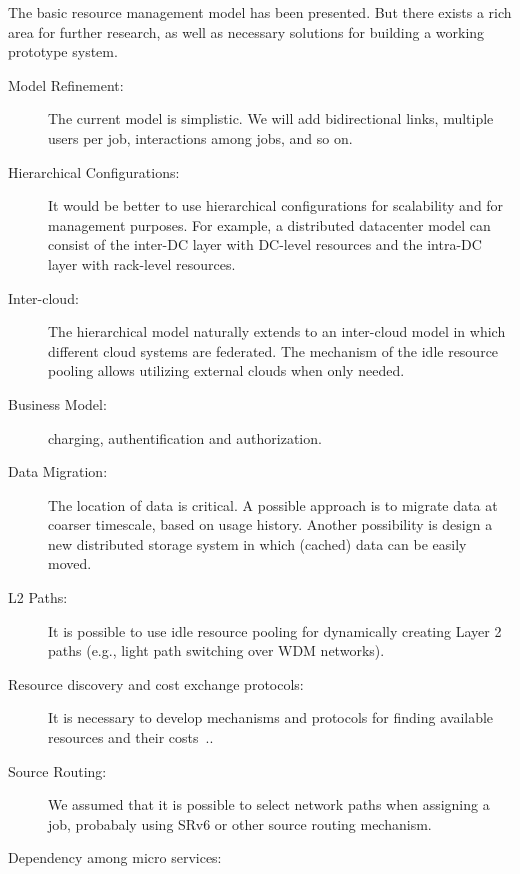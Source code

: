 
The basic resource management model has been presented.
But there exists a rich area for further research, as well as
necessary solutions for building a working prototype system.

\begin{description}

\item[Model Refinement:]  The current model is simplistic. We will add
  bidirectional links, multiple users per job, interactions among
  jobs, and so on.

\item[Hierarchical Configurations:] It would be better to use
  hierarchical configurations for scalability and for management
  purposes.
  For example, a distributed datacenter model can consist of
  the inter-DC layer with DC-level resources and the intra-DC layer
  with rack-level resources.

\item[Inter-cloud:]
  The hierarchical model naturally extends to an inter-cloud model in which
  different cloud systems are federated.
  The mechanism of the idle resource pooling allows utilizing external
  clouds when only needed.

\item [Business Model:] charging, authentification and authorization.

\item[Data Migration:]
  The location of data is critical.
  A possible approach is to migrate data at coarser timescale, based
  on usage history.
  Another possibility is design a new distributed storage system in
  which (cached) data can be easily moved.

\item[L2 Paths:] It is possible to use idle resource pooling for dynamically
  creating Layer 2 paths (e.g., light path switching over WDM networks).

\item[Resource discovery and cost exchange protocols:]
  It is necessary to develop mechanisms and protocols for finding
  available resources and their costs~\cite{Albrecht2008}..

\item[Source Routing:] We assumed that it is possible to select network paths
  when assigning a job, probabaly using SRv6 or other source routing mechanism.

\item[Dependency among micro services:]~\cite{Suresh-SOA-SOCC2017}
  
\end{description}
